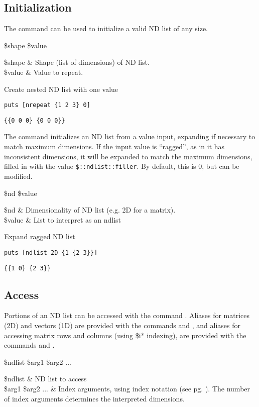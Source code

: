 \documentclass{article}
\begin{document}
\clearpage
\subsection{Initialization}
The command  can be used to initialize a valid ND list of any size.
\begin{syntax}
 \$shape \$value
\end{syntax}
\begin{args}
\$shape & Shape (list of dimensions) of ND list. \\
\$value & Value to repeat.
\end{args}
\begin{example}{Create nested ND list with one value}
\begin{lstlisting}
puts [nrepeat {1 2 3} 0]
\end{lstlisting}
\tcblower
\begin{lstlisting}
{{0 0 0} {0 0 0}}
\end{lstlisting}
\end{example}

The command  initializes an ND list from a value input, expanding if necessary to match maximum dimensions.
If the input value is ``ragged'', as in it has inconsistent dimensions, it will be expanded to match the maximum dimensions, filled in with the value \texttt{\$::ndlist::filler}. By default, this is 0, but can be modified.
\begin{syntax}
 \$nd \$value
\end{syntax}
\begin{args}
\$nd & Dimensionality of ND list (e.g. 2D for a matrix).  \\
\$value & List to interpret as an ndlist
\end{args}
\begin{example}{Expand ragged ND list}
\begin{lstlisting}
puts [ndlist 2D {1 {2 3}}]
\end{lstlisting}
\tcblower
\begin{lstlisting}
{{1 0} {2 3}}
\end{lstlisting}
\end{example}

\clearpage
\subsection{Access}
Portions of an ND list can be accessed with the command .
Aliases for matrices (2D) and vectors (1D) are provided with the commands  and , and aliases for accessing matrix rows and columns (using \$i* indexing), are provided with the commands  and .
\begin{syntax}
 \$ndlist \$arg1 \$arg2 ...
\end{syntax}
\begin{args}
\$ndlist & ND list to access \\
\$arg1 \$arg2 ... & Index arguments, using index notation (see pg. \pageref{indexformat}). The number of index arguments determines the interpreted dimensions.
\end{args}
\end{document}

